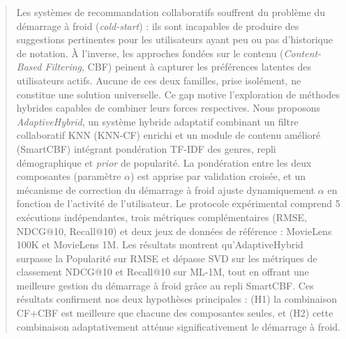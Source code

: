 \documentclass[conference]{IEEEtran}
\begin{document}
\begin{abstract}
	Les systèmes de recommandation collaboratifs souffrent du problème du
	démarrage à froid (\textit{cold-start}) : ils sont incapables de produire des
	suggestions pertinentes pour les utilisateurs ayant peu ou pas d'historique
	de notation. À l'inverse, les approches fondées sur le contenu
	(\textit{Content-Based Filtering}, CBF) peinent à capturer les préférences
	latentes des utilisateurs actifs. Aucune de ces deux familles, prise
	isolément, ne constitue une solution universelle. Ce gap motive l'exploration
	de méthodes hybrides capables de combiner leurs forces respectives. Nous
	proposons \textit{AdaptiveHybrid}, un système hybride adaptatif combinant un
	filtre collaboratif KNN (KNN-CF) enrichi et un module de contenu amélioré
	(SmartCBF) intégrant pondération TF-IDF des genres, repli démographique et
	\textit{prior} de popularité. La pondération entre les deux composantes
	(paramètre $\alpha$) est apprise par validation croisée, et un mécanisme de
	correction du démarrage à froid ajuste dynamiquement $\alpha$ en fonction de
	l'activité de l'utilisateur. Le protocole expérimental comprend 5 exécutions
	indépendantes, trois métriques complémentaires (RMSE, NDCG@10, Recall@10) et
	deux jeux de données de référence : MovieLens 100K et MovieLens 1M. Les
	résultats montrent qu'AdaptiveHybrid surpasse la Popularité sur RMSE et
	dépasse SVD sur les métriques de classement NDCG@10 et Recall@10 sur ML-1M,
	tout en offrant une meilleure gestion du démarrage à froid grâce au repli
	SmartCBF. Ces résultats confirment nos deux hypothèses principales :
	(H1) la combinaison CF+CBF est meilleure que chacune des composantes seules,
	et (H2) cette combinaison adaptativement atténue significativement le démarrage à froid.
	

\end{abstract}
\end{document}
